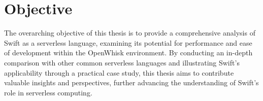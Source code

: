 \section{Objective}

The overarching objective of this thesis is to provide a comprehensive analysis of Swift as a serverless language, examining its potential for performance and ease of development within the OpenWhisk environment. By conducting an in-depth comparison with other common serverless languages and illustrating Swift's applicability through a practical case study, this thesis aims to contribute valuable insights and perspectives, further advancing the understanding of Swift's role in serverless computing.

%
